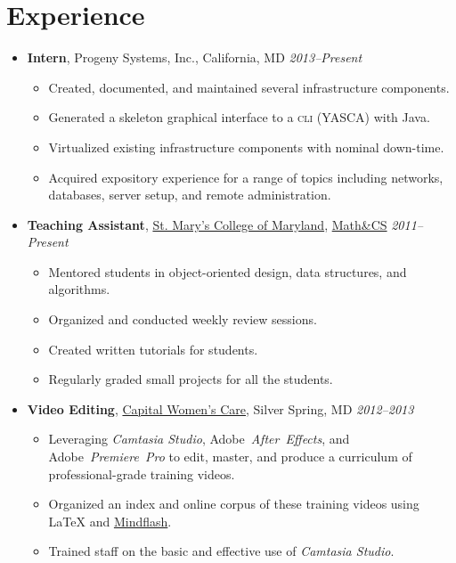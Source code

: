 \documentclass[11pt,letterpaper]{article}
\makeatletter
\newcommand{\position}[5]{\item%
  \begin{tabular*}{1.0\linewidth}{l@{\extracolsep{\fill}}r}
    #1 & #2\\
    \textit{#3} & \textit{#4---#5}
  \end{tabular*}}
\renewcommand{\position}[6][]{%
\item[#1] \hspace*{-2em}\textbf{#4}, #2, #3\hfill
  \textit{#5--#6}\vspace*{-.8em}}
\newcommand{\cwc}{\href{http://www.cwcare.net}{Capital Women's Care}}
\newcommand{\software}[1]{\textsl{#1}}
\newcommand{\smcm}{\href{http://www.smcm.edu}
                        {St. Mary's College of Maryland}}
\makeatother
\begin{document}
\section*{Experience}
\begin{itemize}
\position {Progeny Systems, Inc.}
          {California, MD}
          {Intern}
          {2013}{Present}
          \begin{itemize}
          \item Created, documented, and maintained several infrastructure components.
          \item Generated a skeleton graphical interface to a \textsc{cli} (YASCA) with Java.
          \item Virtualized existing infrastructure components with nominal down-time.
          \item Acquired expository experience for a range of topics including
            networks,
            databases,
            server setup, and
            remote administration.
          \end{itemize}

\position {\smcm}
          {\href{http://www.smcm.edu/mathcs}{Math\&CS}}
          {Teaching Assistant}
          {2011}{Present}
          \begin{itemize}
          \item Mentored students in object-oriented design, data structures, and algorithms.
          \item Organized and conducted weekly review sessions.
          \item Created written tutorials for students.
          \item Regularly graded small projects for all the students.
          \end{itemize}

\position {\cwc}
          {Silver Spring, MD}
          {Video Editing}
          {2012}{2013}
          \begin{itemize}
          \item Leveraging \software{Camtasia Studio},
            Adobe~\software{After~Effects}, and
            Adobe~\software{Premiere~Pro} to edit, master, and produce
            a curriculum of professional-grade training videos.
          \item Organized an index and online corpus of these training videos using \LaTeX{} and \href{http://www.mindflash.com/}{Mindflash}.
          \item Trained staff on the basic and effective use of \software{Camtasia Studio}.
          \end{itemize}


\end{itemize}
\end{document}
